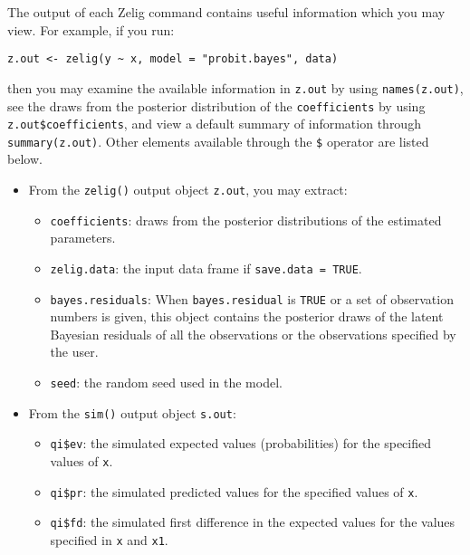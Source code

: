 The output of each Zelig command contains useful information which you may
view. For example, if you run:
\begin{verbatim}
z.out <- zelig(y ~ x, model = "probit.bayes", data)
\end{verbatim}

\noindent then you may examine the available information in \texttt{z.out} by
using \texttt{names(z.out)}, see the draws from the posterior distribution of
the \texttt{coefficients} by using \texttt{z.out\$coefficients}, and view 
a default summary of information through \texttt{summary(z.out)}. 
Other elements available through the \texttt{\$} operator are listed below.

\begin{itemize}
\item From the \texttt{zelig()} output object \texttt{z.out}, you may extract:

\begin{itemize}
\item \texttt{coefficients}: draws from the posterior distributions
of the estimated parameters. 

   \item {\tt zelig.data}: the input data frame if {\tt save.data = TRUE}.  

\item \texttt{bayes.residuals}: When \texttt{bayes.residual} is \texttt{TRUE}
or a set of observation numbers is given, this object contains the 
posterior draws of the latent Bayesian residuals of all the observations 
or the observations specified by the user. 

\item \texttt{seed}: the random seed used in the model.

\end{itemize}

\item From the \texttt{sim()} output object \texttt{s.out}:

\begin{itemize}
\item \texttt{qi\$ev}: the simulated expected values (probabilities) for the specified
values of \texttt{x}.

\item \texttt{qi\$pr}: the simulated predicted values for the specified values
of \texttt{x}.

\item \texttt{qi\$fd}: the simulated first difference in the expected
values for the values specified in \texttt{x} and \texttt{x1}.


\end{itemize}
\end{itemize}
